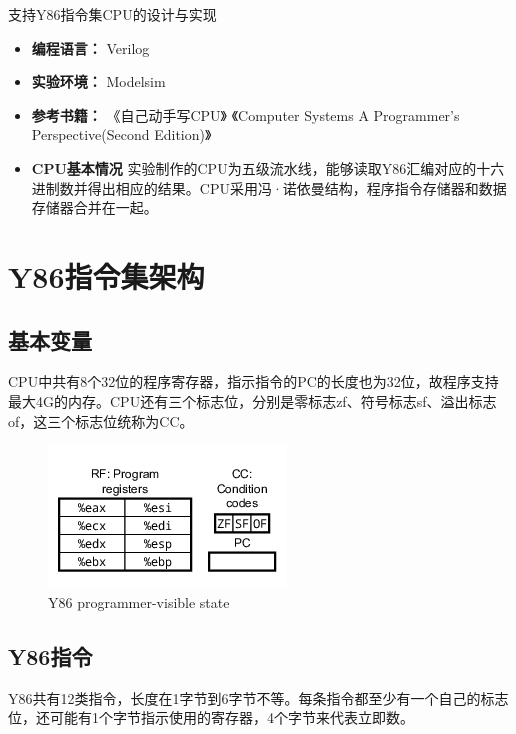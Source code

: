 支持Y86指令集CPU的设计与实现

\begin{itemize}
\item
  \textbf{编程语言：} Verilog
\item
  \textbf{实验环境：} Modelsim
\item
  \textbf{参考书籍：} 《自己动手写CPU》 《Computer Systems A
  Programmer's Perspective(Second Edition)》
\item
  \textbf{CPU基本情况}
  实验制作的CPU为五级流水线，能够读取Y86汇编对应的十六进制数并得出相应的结果。CPU采用冯·诺依曼结构，程序指令存储器和数据存储器合并在一起。
\end{itemize}

\section{Y86指令集架构}\label{y86ux6307ux4ee4ux96c6ux67b6ux6784}

\subsection{基本变量}\label{ux57faux672cux53d8ux91cf}

CPU中共有8个32位的程序寄存器，指示指令的PC的长度也为32位，故程序支持最大4G的内存。CPU还有三个标志位，分别是零标志zf、符号标志sf、溢出标志of，这三个标志位统称为CC。

\begin{figure}[htbp]
\centering
\includegraphics{img/state.png}
\caption{Y86 programmer-visible state}
\end{figure}

\subsection{Y86指令}\label{y86ux6307ux4ee4}

Y86共有12类指令，长度在1字节到6字节不等。每条指令都至少有一个自己的标志位，还可能有1个字节指示使用的寄存器，4个字节来代表立即数。

